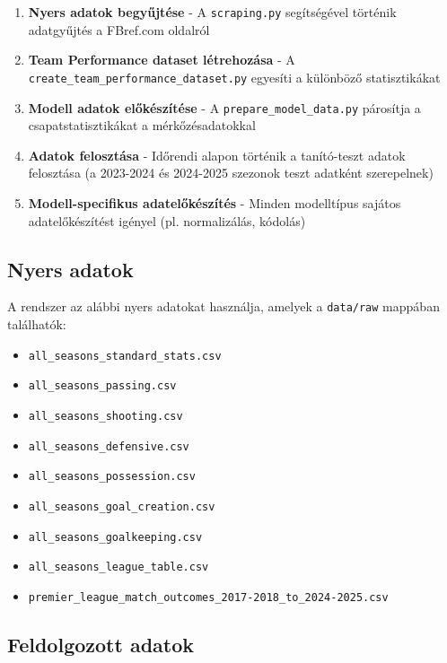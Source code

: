 \begin{enumerate}
    \item \textbf{Nyers adatok begyűjtése} - A \texttt{scraping.py} segítségével történik adatgyűjtés a FBref.com oldalról
    \item \textbf{Team Performance dataset létrehozása} - A \texttt{create\_team\_performance\_dataset.py} egyesíti a különböző statisztikákat
    \item \textbf{Modell adatok előkészítése} - A \texttt{prepare\_model\_data.py} párosítja a csapatstatisztikákat a mérkőzésadatokkal
    \item \textbf{Adatok felosztása} - Időrendi alapon történik a tanító-teszt adatok felosztása (a 2023-2024 és 2024-2025 szezonok teszt adatként szerepelnek)
    \item \textbf{Modell-specifikus adatelőkészítés} - Minden modelltípus sajátos adatelőkészítést igényel (pl. normalizálás, kódolás)
\end{enumerate}

\subsection{Nyers adatok}

A rendszer az alábbi nyers adatokat használja, amelyek a \texttt{data/raw} mappában találhatók:

\begin{itemize}
    \item \texttt{all\_seasons\_standard\_stats.csv}
    \item \texttt{all\_seasons\_passing.csv}
    \item \texttt{all\_seasons\_shooting.csv}
    \item \texttt{all\_seasons\_defensive.csv}
    \item \texttt{all\_seasons\_possession.csv}
    \item \texttt{all\_seasons\_goal\_creation.csv} 
    \item \texttt{all\_seasons\_goalkeeping.csv} 
    \item \texttt{all\_seasons\_league\_table.csv} 
    \item \texttt{premier\_league\_match\_outcomes\_2017-2018\_to\_2024-2025.csv}
\end{itemize}


\subsection{Feldolgozott adatok}

